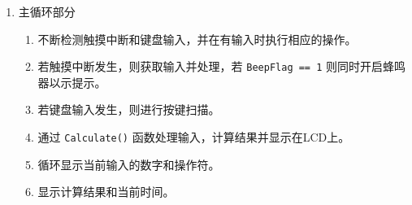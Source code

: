 \documentclass{theme-2639013-final}
\begin{document}
\begin{enumerate}
  \item 主循环部分
    \begin{enumerate}
      \item 不断检测触摸中断和键盘输入，并在有输入时执行相应的操作。
      \item 若触摸中断发生，则获取输入并处理，若 \texttt{BeepFlag == 1} 则同时开启蜂鸣器以示提示。
      \item 若键盘输入发生，则进行按键扫描。
      \item 通过 \texttt{Calculate()} 函数处理输入，计算结果并显示在LCD上。
      \item 循环显示当前输入的数字和操作符。
      \item 显示计算结果和当前时间。
    \end{enumerate}
\end{enumerate}
\end{document}
